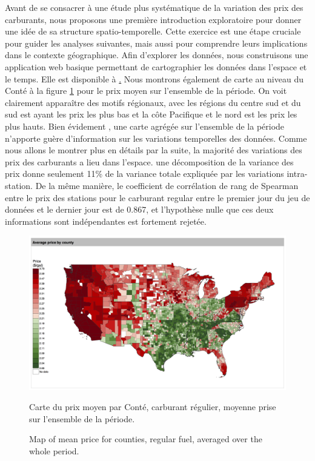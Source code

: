 {Avant de se consacrer à une étude plus systématique de la variation des prix des carburants, nous proposons une première introduction exploratoire pour donner une idée de sa structure spatio-temporelle. Cette exercice est une étape cruciale pour guider les analyses suivantes, mais aussi pour comprendre leurs implications dans le contexte géographique. Afin d'explorer les données, nous construisons une application web basique permettant de cartographier les données dans l'espace et le temps. Elle est disponible à \href{http://shiny.parisgeo.cnrs.fr/fuelprice/}. Nous montrons également de carte au niveau du Conté à la figure \ref{fig:map_price} pour le prix moyen sur l'ensemble de la période. On voit clairement apparaître des motifs régionaux, avec les régions du centre sud et du sud est ayant les prix les plus bas et la côte Pacifique et le nord est les prix les plus hauts. Bien évidement , une carte agrégée sur l'ensemble de la période n'apporte guère d'information sur les variations temporelles des données. Comme nous allons le montrer plus en détails par la suite, la majorité des variations des prix des carburants a lieu dans l'espace. une décomposition de la variance des prix donne seulement 11\% de la variance totale expliquée par les variations intra-station. De la même manière, le coefficient de corrélation de rang de Spearman entre le prix des stations pour le carburant regular entre le premier jour du jeu de données et le dernier jour est de 0.867, et l'hypothèse nulle que ces deux informations sont indépendantes est fortement rejetée.
}


\begin{figure}
\centering
\includegraphics[width=\textwidth]{Figures/EnergyPrice/average_regular_map}
\caption{Map of mean price for counties, regular fuel, averaged over the whole period.}{Carte du prix moyen par Conté, carburant régulier, moyenne prise sur l'ensemble de la période.}\vspace{-0.3cm}
\label{fig:map_price}
\end{figure}

